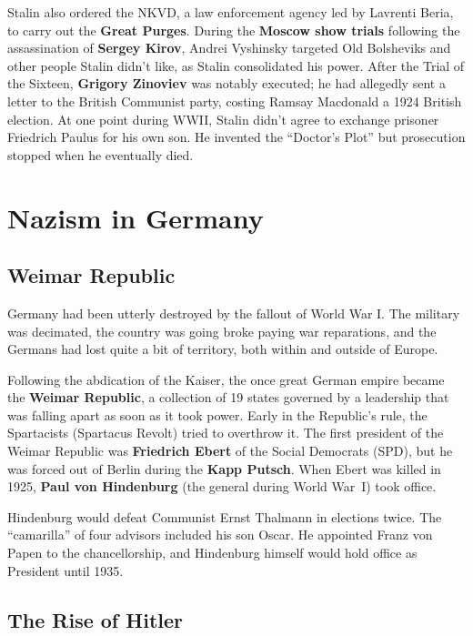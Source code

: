 Stalin also ordered the NKVD, a law enforcement agency led by Lavrenti Beria,
to carry out the \textbf{Great Purges}.
During the \textbf{Moscow show trials} following the assassination of \textbf{Sergey Kirov},
Andrei Vyshinsky targeted Old Bolsheviks and other people Stalin didn't like, as Stalin consolidated his power.
After the Trial of the Sixteen, \textbf{Grigory Zinoviev} was notably executed;
he had allegedly sent a letter to the British Communist party, costing Ramsay Macdonald a 1924 British election.
At one point during WWII, Stalin didn't agree to exchange prisoner Friedrich Paulus for his own son.
He invented the ``Doctor's Plot'' but prosecution stopped when he eventually died.

\section{Nazism in Germany}

\subsection*{Weimar Republic}

Germany had been utterly destroyed by the fallout of World War I\@.
The military was decimated, the country was going broke paying war reparations,
and the Germans had lost quite a bit of territory, both within and outside of Europe.

Following the abdication of the Kaiser,
the once great German empire became the \textbf{Weimar Republic},
a collection of 19 states governed by a leadership that was falling apart as soon as it took power.
Early in the Republic's rule, the Spartacists (Spartacus Revolt) tried to overthrow it.
The first president of the Weimar Republic was \textbf{Friedrich Ebert} of the Social Democrats (SPD),
but he was forced out of Berlin during the \textbf{Kapp Putsch}.
When Ebert was killed in 1925, \textbf{Paul von Hindenburg} (the general during World War~I) took office.

Hindenburg would defeat Communist Ernst Thalmann in elections twice.
The ``camarilla'' of four advisors included his son Oscar.
He appointed Franz von Papen to the chancellorship,
and Hindenburg himself would hold office as President until 1935.

\subsection*{The Rise of Hitler}

